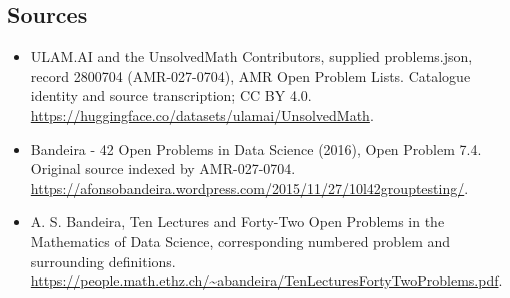 \documentclass[11pt,a4paper]{article}
\begin{document}
\subsection{Sources}
\begin{itemize}
\item[S1] ULAM.AI and the UnsolvedMath Contributors, supplied problems.json, record 2800704 (AMR-027-0704), AMR Open Problem Lists. Catalogue identity and source transcription; CC BY 4.0.
\url{https://huggingface.co/datasets/ulamai/UnsolvedMath}.
\item[S2] Bandeira - 42 Open Problems in Data Science (2016), Open Problem 7.4. Original source indexed by AMR-027-0704.
\url{https://afonsobandeira.wordpress.com/2015/11/27/10l42grouptesting/}.
\item[S3] A. S. Bandeira, Ten Lectures and Forty-Two Open Problems in the Mathematics of Data Science, corresponding numbered problem and surrounding definitions.
\url{https://people.math.ethz.ch/~abandeira/TenLecturesFortyTwoProblems.pdf}.
\end{itemize}
\end{document}
